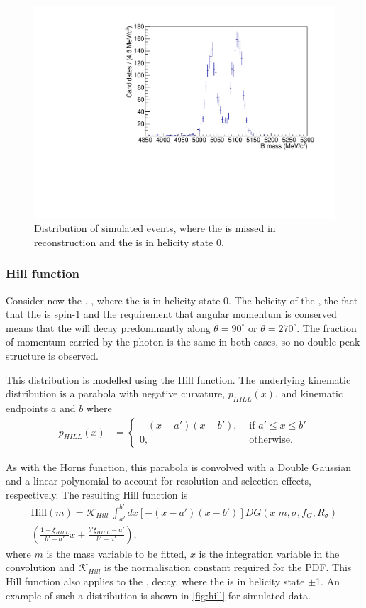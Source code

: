 \begin{figure}[h]
\centering
\includegraphics[width=0.5\linewidth]{figures/fitComponents/horns.pdf}
\caption{Distribution of simulated \decay{\Bm}{(\decay{\Dstarz}{\Dz\piz})\Kstarm} events, where the \piz is missed in reconstruction and the \Dstarz is in helicity state 0.}
\label{fig:horns}
\end{figure}

\subsubsection{Hill function}

Consider now the \decay{\Bm}{\Dstarz\Kstarm}, \decay{\Dstarz}{\Dz\gamma}, where the \Dstarz is in helicity state 0. The helicity of the \Dstarz, the fact that the \Pgamma is spin-1 and the requirement that angular momentum is conserved means that the \Pgamma will decay predominantly along $\theta = 90^{\circ}$ or $\theta = 270^{\circ}$. The fraction of momentum carried by the photon is the same in both cases, so no double peak structure is observed.

This distribution is modelled using the Hill function. The underlying kinematic distribution is a parabola with negative curvature, $p_{HILL}(x)$, and kinematic endpoints $a$ and $b$ where
\begin{align}
p_{HILL}(x) &= \begin{cases}
-(x - a')(x - b'), & \text{ if $a' \leq x \leq b'$}\\ 	
0, & \text{ otherwise.}
\end{cases} 
\end{align}

As with the Horns function, this parabola is convolved with a Double Gaussian and a linear polynomial to account for resolution and selection effects, respectively. The resulting Hill function is
\begin{multline}
\text{Hill}(m) = \mathcal{K}_{Hill}\ \int_{a'}^{b'} dx \left[-(x - a')(x - b')\right] DG(x|m,\sigma,f_G,R_{\sigma}) \\
\left( \frac{1 - \xi_{HILL}}{b' - a'}x + \frac{b'\xi_{HILL} - a'}{b' - a'}\right),
\label{eqn:hill}
\end{multline}
where $m$ is the mass variable to be fitted, $x$ is the integration variable in the convolution and $\mathcal{K}_{Hill}$ is the normalisation constant required for the PDF. This Hill function also applies to the \decay{\Bm}{\Dstarz\Kstarm}, \decay{\Dstarz}{\Dz\piz} decay, where the \Dstarz is in helicity state $\pm$1. An example of such a distribution is shown in \fig\ref{fig:hill} for simulated data.


